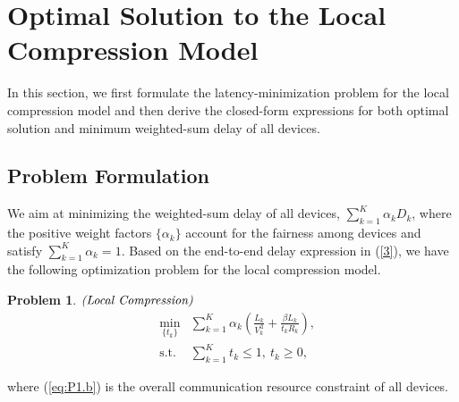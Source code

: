 \documentclass[journal,draftcls,onecolumn,12pt,twoside]{IEEEtran}
\newtheorem{prob}{Problem}
\begin{document}
\section{Optimal Solution to the Local Compression Model}
In this section, we first formulate the latency-minimization problem for the local compression model and then derive the closed-form expressions for both optimal solution and minimum weighted-sum delay of all devices.

\subsection{Problem Formulation}
We aim at minimizing the weighted-sum delay of all devices, $\sum_{k=1}^K \alpha_k D_k$, where the positive weight factors $\{\alpha_k\}$ account for the fairness among devices and satisfy $\sum_{k=1}^K \alpha_k = 1$. Based on the end-to-end delay expression in (\ref{3}), we have the following optimization problem for the local compression model.
\begin{prob}$\emph{(Local~Compression)}$
\begin{subequations}
	\begin{eqnarray}
	&\min\limits_{\{t_k\}}&\sum_{k=1}^K \alpha_k\left(\frac{L_k}{V_k^{\text{d}}}+\frac{\beta L_k}{t_k R_k}\right),\label{eq:P1.a}\\
	&\text{s.t.}&\sum_{k=1}^K t_k \le 1,~t_k \ge 0, \label{eq:P1.b}
	\end{eqnarray}
\end{subequations}
\end{prob}
where (\ref{eq:P1.b}) is the overall communication resource constraint of all devices.
\end{document}
